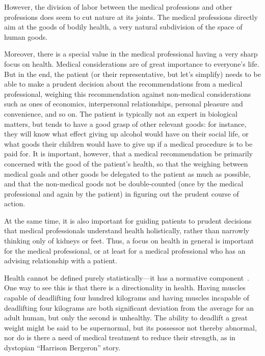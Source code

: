 However, the division of labor between the medical professions and other professions does seem to cut nature at its joints. The medical professions directly
aim at the goods of bodily health, a very natural subdivision of the space of human goods. 

Moreover, there is a special value in the medical professional
having a very sharp focus on health.
 Medical considerations are of great importance to everyone's life. But in
the end, the patient (or their representative, but let's simplify) needs to be able to make a prudent decision about the recommendations
from a medical professional, weighing this recommendation against non-medical considerations such as ones of economics, interpersonal relationships, personal
pleasure and convenience, and so on. The patient is typically not an expert in biological matters, but tends to have a good grasp of other relevant goods:
for instance, they will know what effect giving up alcohol would have on their social life, or what goods their children would have to give up if a medical
procedure is to be paid for. It is important, however, that a medical recommendation be primarily concerned with the good of the patient's health, so that
the weighing between medical goals and other goods be delegated to the patient as much as possible, and that the non-medical goods not be double-counted (once by the
medical professional and again by the patient) in figuring out the prudent course of action.

At the same time, it is also important for guiding patients to prudent
decisions that medical professionals understand health holistically, rather than narrowly thinking only of kidneys or feet. Thus, a focus on health in general
is important for the medical professional, or at least for a medical professional who has an advising relationship with a patient.

Health cannot be defined purely statistically---it has a normative component~\cite{LennoxHealth}. 
One way to see this is that there is a directionality in health. Having muscles capable of deadlifting
four hundred kilograms and having muscles incapable of deadlifting four kilograms are both significant
deviation from the average for an adult human, but only the second is unhealthy. The ability to deadlift
a great weight might be said to be supernormal, but its possessor not thereby abnormal, nor do 
is there a need of medical treatment to reduce their strength, as in  dystopian 
``Harrison Bergeron'' story. 

